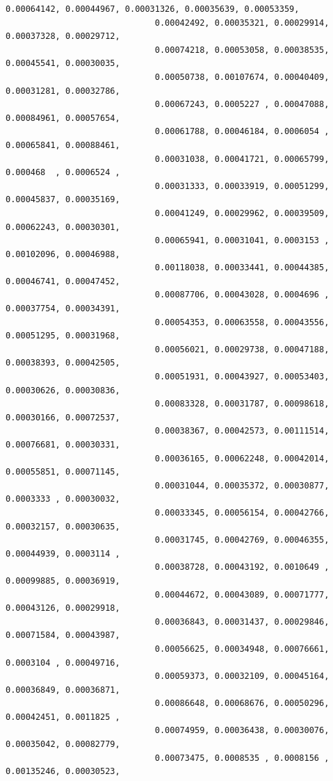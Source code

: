 \documentclass[11pt]{article}
\begin{document}
\begin{Verbatim}[commandchars=\\\{\}]
                              0.00064142, 0.00044967, 0.00031326, 0.00035639, 0.00053359,
                              0.00042492, 0.00035321, 0.00029914, 0.00037328, 0.00029712,
                              0.00074218, 0.00053058, 0.00038535, 0.00045541, 0.00030035,
                              0.00050738, 0.00107674, 0.00040409, 0.00031281, 0.00032786,
                              0.00067243, 0.0005227 , 0.00047088, 0.00084961, 0.00057654,
                              0.00061788, 0.00046184, 0.0006054 , 0.00065841, 0.00088461,
                              0.00031038, 0.00041721, 0.00065799, 0.000468  , 0.0006524 ,
                              0.00031333, 0.00033919, 0.00051299, 0.00045837, 0.00035169,
                              0.00041249, 0.00029962, 0.00039509, 0.00062243, 0.00030301,
                              0.00065941, 0.00031041, 0.0003153 , 0.00102096, 0.00046988,
                              0.00118038, 0.00033441, 0.00044385, 0.00046741, 0.00047452,
                              0.00087706, 0.00043028, 0.0004696 , 0.00037754, 0.00034391,
                              0.00054353, 0.00063558, 0.00043556, 0.00051295, 0.00031968,
                              0.00056021, 0.00029738, 0.00047188, 0.00038393, 0.00042505,
                              0.00051931, 0.00043927, 0.00053403, 0.00030626, 0.00030836,
                              0.00083328, 0.00031787, 0.00098618, 0.00030166, 0.00072537,
                              0.00038367, 0.00042573, 0.00111514, 0.00076681, 0.00030331,
                              0.00036165, 0.00062248, 0.00042014, 0.00055851, 0.00071145,
                              0.00031044, 0.00035372, 0.00030877, 0.0003333 , 0.00030032,
                              0.00033345, 0.00056154, 0.00042766, 0.00032157, 0.00030635,
                              0.00031745, 0.00042769, 0.00046355, 0.00044939, 0.0003114 ,
                              0.00038728, 0.00043192, 0.0010649 , 0.00099885, 0.00036919,
                              0.00044672, 0.00043089, 0.00071777, 0.00043126, 0.00029918,
                              0.00036843, 0.00031437, 0.00029846, 0.00071584, 0.00043987,
                              0.00056625, 0.00034948, 0.00076661, 0.0003104 , 0.00049716,
                              0.00059373, 0.00032109, 0.00045164, 0.00036849, 0.00036871,
                              0.00086648, 0.00068676, 0.00050296, 0.00042451, 0.0011825 ,
                              0.00074959, 0.00036438, 0.00030076, 0.00035042, 0.00082779,
                              0.00073475, 0.0008535 , 0.0008156 , 0.00135246, 0.00030523,

\end{Verbatim}
\end{document}
